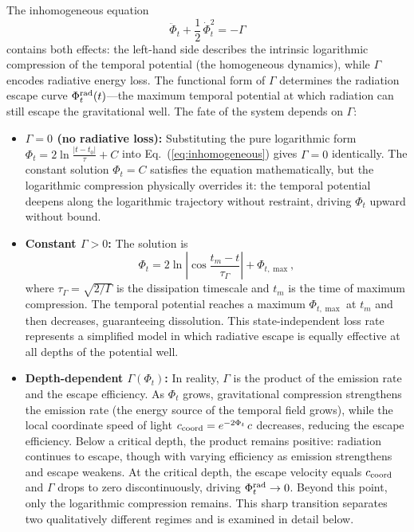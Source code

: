 \documentclass[12pt]{article}
\begin{document}
The inhomogeneous equation
\begin{equation}
\boxed{\ddot{\Phi}_t + \frac{1}{2}\,\dot{\Phi}_t^2 = -\Gamma}
\label{eq:inhomogeneous}
\end{equation}
contains both effects: the left-hand side describes the intrinsic logarithmic compression of the temporal potential (the homogeneous dynamics), while $\Gamma$ encodes radiative energy loss. The functional form of $\Gamma$ determines the radiation escape curve $\Phi_t^{\rm rad}(t)$---the maximum temporal potential at which radiation can still escape the gravitational well. The fate of the system depends on $\Gamma$:
\begin{itemize}
\item \textbf{$\Gamma = 0$ (no radiative loss):} Substituting the pure logarithmic form $\Phi_t = 2\ln\frac{|t - t_0|}{\tau} + C$ into Eq.~(\ref{eq:inhomogeneous}) gives $\Gamma = 0$ identically. The constant solution $\Phi_t = C$ satisfies the equation mathematically, but the logarithmic compression physically overrides it: the temporal potential deepens along the logarithmic trajectory without restraint, driving $\Phi_t$ upward without bound.

\item \textbf{Constant $\Gamma > 0$:} The solution is
\begin{equation}
\Phi_t = 2\ln\left|\cos\frac{t_m - t}{\tau_\Gamma}\right| + \Phi_{t,\max},
\label{eq:cos_solution}
\end{equation}
where $\tau_\Gamma = \sqrt{2/\Gamma}$ is the dissipation timescale and $t_m$ is the time of maximum compression. The temporal potential reaches a maximum $\Phi_{t,\max}$ at $t_m$ and then decreases, guaranteeing dissolution. This state-independent loss rate represents a simplified model in which radiative escape is equally effective at all depths of the potential well.

\item \textbf{Depth-dependent $\Gamma(\Phi_t)$:} In reality, $\Gamma$ is the product of the emission rate and the escape efficiency. As $\Phi_t$ grows, gravitational compression strengthens the emission rate (the energy source of the temporal field grows), while the local coordinate speed of light $c_{\rm coord} = e^{-2\Phi_t}\,c$ decreases, reducing the escape efficiency. Below a critical depth, the product remains positive: radiation continues to escape, though with varying efficiency as emission strengthens and escape weakens. At the critical depth, the escape velocity equals $c_{\rm coord}$ and $\Gamma$ drops to zero discontinuously, driving $\Phi_t^{\rm rad} \to 0$. Beyond this point, only the logarithmic compression remains. This sharp transition separates two qualitatively different regimes and is examined in detail below.
\end{itemize}
\end{document}
